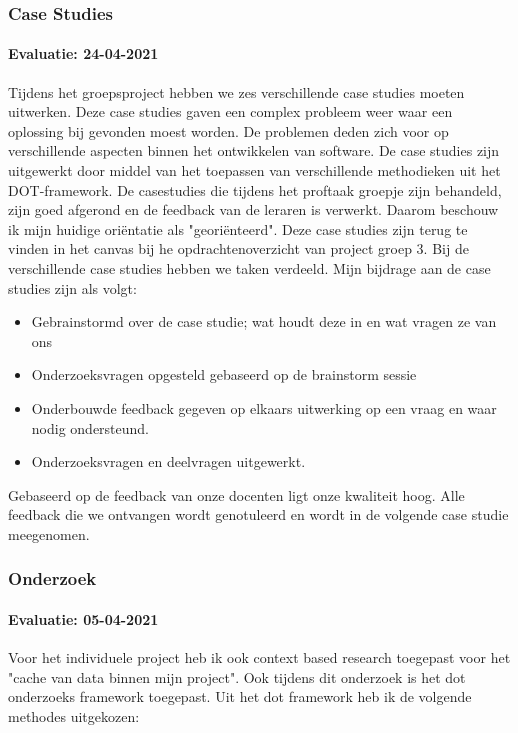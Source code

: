 \subsubsection{Case Studies}
\paragraph{Evaluatie: 24-04-2021}
Tijdens het groepsproject hebben we zes verschillende case studies moeten uitwerken.
Deze case studies gaven een complex probleem weer waar een oplossing bij gevonden moest worden.
De problemen deden zich voor op verschillende aspecten binnen het ontwikkelen van software.
De case studies zijn uitgewerkt door middel van het toepassen van verschillende methodieken uit het DOT-framework.
De casestudies die tijdens het proftaak groepje zijn behandeld, zijn goed afgerond en de feedback van de leraren is
verwerkt.
Daarom beschouw ik mijn huidige oriëntatie als "georiënteerd".
Deze case studies zijn terug te vinden in het canvas bij he opdrachtenoverzicht van project groep 3.
Bij de verschillende case studies hebben we taken verdeeld. Mijn bijdrage aan de case studies zijn als volgt:

\begin{itemize}
	\setlength{\itemsep}{0pt}%
	\setlength{\parskip}{0pt}%
	\item Gebrainstormd over de case studie; wat houdt deze in en wat vragen ze van ons
	\item Onderzoeksvragen opgesteld gebaseerd op de brainstorm sessie
	\item Onderbouwde feedback gegeven op elkaars uitwerking op een vraag en waar nodig ondersteund.
	\item Onderzoeksvragen en deelvragen uitgewerkt.

\end{itemize}

Gebaseerd op de feedback van onze docenten ligt onze kwaliteit hoog.
Alle feedback die we ontvangen wordt genotuleerd en wordt in de volgende case studie meegenomen.

\subsubsection{Onderzoek}
\paragraph{Evaluatie: 05-04-2021}
Voor het individuele project heb ik ook context based research toegepast voor het "cache van data binnen mijn project".
Ook tijdens dit onderzoek is het dot onderzoeks framework toegepast.
Uit het dot framework heb ik de volgende methodes uitgekozen:

